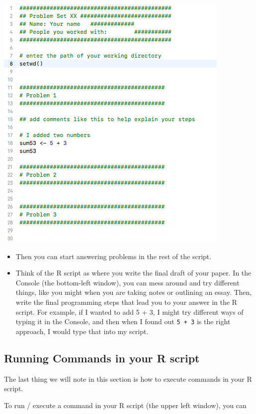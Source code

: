 \documentclass[
  letterpaper,
  DIV=11,
  numbers=noendperiod]{scrreprt}
\providecommand{\tightlist}{%
  \setlength{\itemsep}{0pt}\setlength{\parskip}{0pt}}\usepackage{longtable,booktabs,array}
\begin{document}
\includegraphics{images/templateR.png}

\begin{itemize}
\tightlist
\item
  Then you can start answering problems in the rest of the script.
\item
  Think of the R script as where you write the final draft of your
  paper. In the Console (the bottom-left window), you can mess around
  and try different things, like you might when you are taking notes or
  outlining an essay. Then, write the final programming steps that lead
  you to your answer in the R script. For example, if I wanted to add 5
  + 3, I might try different ways of typing it in the Console, and then
  when I found out \texttt{5\ +\ 3} is the right approach, I would type
  that into my script.
\end{itemize}

\hypertarget{running-commands-in-your-r-script}{%
\subsection{Running Commands in your R
script}\label{running-commands-in-your-r-script}}

The last thing we will note in this section is how to execute commands
in your R script.

To run / execute a command in your R script (the upper left window), you
can
\end{document}
